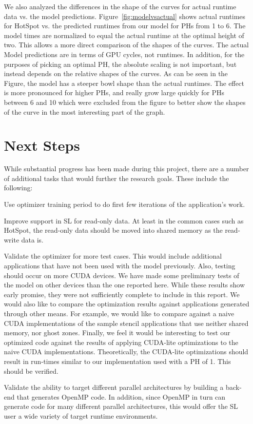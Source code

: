 \documentclass{styles/sig-alternate}
\begin{document}
We also analyzed the differences in the shape of the curves for actual runtime data vs. the model predictions.  
Figure~\ref{fig:modelvsactual} shows actual runtimes for HotSpot vs. the predicted runtimes from our model for 
PHs from 1 to 6.  The model times are normalized to equal the actual runtime at the optimal height of two.
This allows a more direct comparison of the shapes of the curves.  The actual Model predictions are in terms of GPU cycles,
not runtimes.  In addition, for the purposes of picking an optimal PH, the absolute scaling is not important,
but instead depends on the relative shapes of the curves.  As can be seen in the Figure, the model has a steeper bowl shape
than the actual runtimes.  The effect is more pronounced for higher PHs, and really grow large quickly for PHs 
between 6 and 10 which were excluded from the figure to better show the shapes of the curve in the most interesting part of the graph.


\section{Next Steps}

While substantial progress has been made during this project, 
there are a number of additional tasks that would further the research goals.  
These include the following:

\begin{enumerate*}
\item Use optimizer training period to do first few iterations of the application's work.
\item Improve support in SL for read-only data.  At least in the common cases such as HotSpot,
the read-only data should be moved into shared memory as the read-write data is.
\item Validate the optimizer for more test cases.
This would include additional applications that have not been used with the
model previously.  Also, testing should occur on more CUDA devices.  
We have made some preliminary tests of the model on other devices than the one reported here.  
While these results show early promise, they were not sufficiently complete to include in this
report.  We would also like to compare the optimization results against applications generated
through other means.  For example, we would like to compare against a naive CUDA implementations of
the sample stencil applications that use neither shared memory, nor ghost zones.  
Finally, we feel it would be interesting to test our optimized code 
against the results of applying CUDA-lite optimizations to the naive CUDA implementations.
Theoretically, the CUDA-lite optimizations should result in run-times similar to our
implementation used with a PH of 1.  This should be verified.
\item Validate the ability to target different parallel architectures by building a back-end
that generates OpenMP code.  In addition, since OpenMP in turn can generate code for many different parallel
architectures, this would offer the SL user a wide variety of target runtime environments.
\end{enumerate*}
\end{document}
